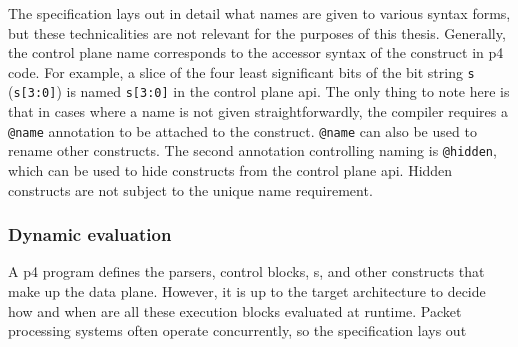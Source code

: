 The \pfs specification lays out in detail what names are given to various syntax
forms, but these technicalities are not relevant for the purposes of this
thesis. Generally, the control plane name corresponds to the accessor syntax of
the construct in \acrshort{p4} code. For example, a slice of the four least
significant bits of the bit string \texttt{s} (\texttt{s[3:0]}) is named
\texttt{s[3:0]} in the control plane \acrshort{api}. The only thing to note here
is that in cases where a name is not given straightforwardly, the compiler
requires a \texttt{@name} annotation to be attached to the construct.
\texttt{@name} can also be used to rename other constructs. The second
annotation controlling naming is \texttt{@hidden}, which can be used to hide
constructs from the control plane \acrshort{api}. Hidden constructs are not
subject to the unique name requirement.

\subsubsection*{Dynamic evaluation}

A \acrshort{p4} program defines the parsers, control blocks, \extern{}s, and
other constructs that make up the data plane. However, it is up to the target
architecture to decide how and when are all these execution blocks evaluated at
runtime. Packet processing systems often operate concurrently, so the \pfs
specification lays out
